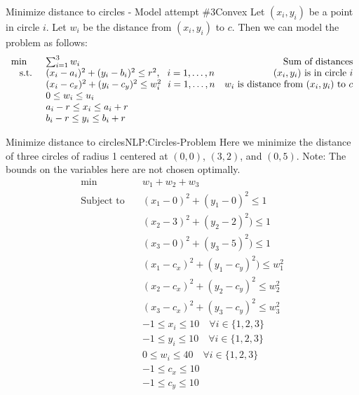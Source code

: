 \begin{general}{Minimize distance to circles - Model attempt $\#3$}{Convex}
Let $(x_i,y_i)$ be a point in circle $i$.  Let $w_i$ be the distance from $(x_i, y_i)$ to $c$.  Then we can  model the problem as follows:
\begin{equation}
\begin{array}{rlr}
\min \quad & \sum_{i=1}^3 w_i \hfill & \text{ Sum of distances}\\
\text{ s.t. } & (x_i - a_i)^2  + (y_i - b_i)^2  \leq r^2 , \ \ i=1,\dots, n& \text{ $(x_i, y_i)$ is in circle $i$}\\
& (x_i - c_x)^2 + (y_i - c_y)^2\leq w_i^2 \ \ i=1, \dots, n & \text{$w_i$ is distance from $(x_i, y_i)$ to $c$}\\
& 0 \leq w_i \leq u_i\\
& a_i - r \leq x_i \leq a_i + r\\
& b_i -r \leq y_i \leq b_i + r\\
\end{array}
\end{equation}
\end{general}

\begin{examplewithcode}{Minimize distance to circles}{NLP:Circles-Problem}
Here we minimize the distance of three circles of radius 1 centered at $(0,0)$, $(3,2)$, and $(0,5)$.  
Note: The bounds on the variables here are not chosen optimally. 
\begin{align*}\min\quad & w_{1} + w_{2} + w_{3}\\
\text{Subject to} \quad & (x_{1} - 0) ^ 2 + (y_{1} - 0)^ 2  \leq 1\\
 & (x_{2} - 3) ^ 2 + (y_{2} - 2) ^ 2)  \leq 1\\
 & (x_{3} - 0) ^ 2 + (y_{3} - 5) ^ 2)  \leq 1\\
 & (x_{1} - c_x) ^ 2 + (y_{1} - c_y) ^ 2) \leq w_{1}^ 2\\
 & (x_{2} - c_x) ^ 2 + (y_{2} - c_y) ^ 2\leq w_{2}^ 2\\
 & (x_{3} - c_x) ^ 2 + (y_{3} - c_y) ^ 2\leq w_{3}^ 2\\
 & -1 \leq x_{i} \leq 10 \quad\forall i \in \{1,2,3\}\\
 & -1 \leq y_{i} \leq 10 \quad\forall i \in \{1,2,3\}\\
 & 0 \leq w_{i} \leq 40 \quad\forall i \in \{1,2,3\}\\
 & -1 \leq c_x \leq 10\\
 & -1 \leq c_y \leq 10\\
\end{align*}
\end{examplewithcode}


